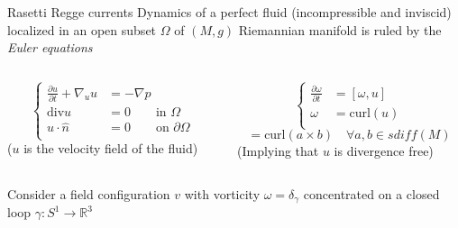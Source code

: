 \documentclass[beamer,10pt]{standalone}
\begin{document}
  \begin{frame}{Rasetti Regge currents} \label{frame:RRcurrents}
  		Dynamics of a perfect fluid (incompressible and inviscid) localized in an open subset $\Omega$ 
  		of $(M,g)$ Riemannian manifold is ruled by the \emph{Euler equations}
  		\begin{columns}
				\begin{column}[T]{0.5\textwidth}
  					\begin{displaymath}\tag{EE}
							\begin{cases}
								\frac{\partial u}{\partial t} + \nabla_u u & = -\nabla p  \\
								\textrm{div} u &= 0 \qquad \textrm{in } \Omega \\
								u \cdot \hat{n} &= 0 \qquad \textrm{on } \partial \Omega \\
							\end{cases}
			  		\end{displaymath}
		  		($u$ is the velocity field of the fluid)
				\end{column}
				\vline
				\begin{column}[T]{0.5\textwidth}
  					\begin{displaymath}\tag{EE vorticity form}
							\begin{cases}
			  				\frac{\partial \omega}{\partial t} &= [\omega, u] \\
								\omega &= \textrm{curl}\left( u \right)  \\
							\end{cases}
			  		\end{displaymath}
				\begin{displaymath}
					[a,b] = \textrm{curl}\left( a \times b \right) \quad \forall a,b \in sdiff(M)		
				\end{displaymath}	
					(Implying that $u$ is divergence free)\\	
				\end{column}
			\end{columns}
			\begin{asideblock}
			\begin{columns}
				\begin{column}{0.85\textwidth}
					Consider a field configuration $v$ with vorticity $\omega= \delta_\gamma$ 
					concentrated on a closed loop $\gamma: S^1 \to \mathbb{R}^3$\\

\end{column}
\end{columns}
\end{asideblock}
\end{frame}
\end{document}
